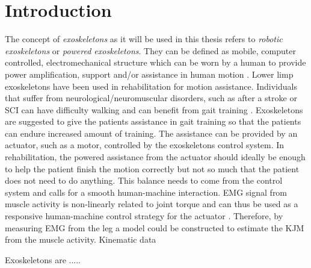 \documentclass[../main.tex]{subfiles}
\begin{document}
\chapter{Introduction}
The concept of \textit{exoskeletons} as it will be used in this thesis refers to \textit{robotic exoskeletons} or \textit{powered exoskeletons}. 
They can be defined as mobile, computer controlled, electromechanical structure which can be worn by a human to provide power amplification, support and/or assistance in human motion \cite{Anam2012, Gorgey2018}. 
Lower limp exoskeletons have been used in rehabilitation for motion assistance.
Individuals that suffer from neurological/neuromuscular disorders, such as after a stroke or \ac{SCI} can have difficulty walking and can benefit from gait training \cite{Gorgey2018, Young2017, Lerner2017}.
Exoskeletons are suggested to give the patients assistance in gait training so that the patients can endure increased amount of training.
The assistance can be provided by an actuator, such as a motor, controlled by the exoskeletons control system.
In rehabilitation, the powered assistance from the actuator should ideally be enough to help the patient finish the motion correctly but not so much that the patient does not need to do anything.
This balance needs to come from the control system and calls for a smooth human-machine interaction.
\Ac{EMG} signal from muscle activity is non-linearly related to joint torque and can thus be used as a responsive human-machine control strategy for the actuator \cite{Young2017}.
Therefore, by measuring \ac{EMG} from the leg a model could be constructed to estimate the \ac{KJM} from the muscle activity.
Kinematic data 

Exoskeletons are .....


\end{document}
